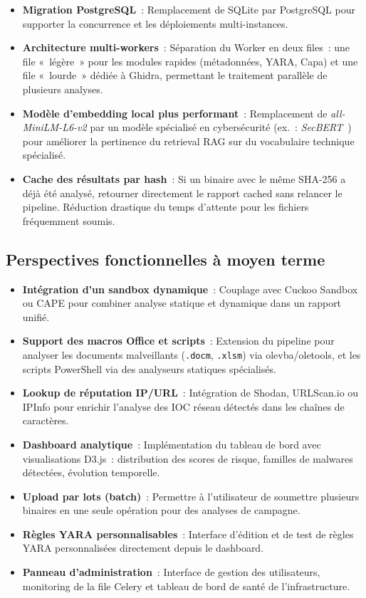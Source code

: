 \begin{itemize}
  \item \textbf{Migration PostgreSQL}~: Remplacement de SQLite par PostgreSQL pour supporter la concurrence et les déploiements multi-instances.
  \item \textbf{Architecture multi-workers}~: Séparation du Worker en deux files~: une file «~légère~» pour les modules rapides (métadonnées, YARA, Capa) et une file «~lourde~» dédiée à Ghidra, permettant le traitement parallèle de plusieurs analyses.
  \item \textbf{Modèle d'embedding local plus performant}~: Remplacement de \textit{all-MiniLM-L6-v2} par un modèle spécialisé en cybersécurité (ex.~: \textit{SecBERT}~\cite{secbert2022}) pour améliorer la pertinence du retrieval RAG sur du vocabulaire technique spécialisé.
  \item \textbf{Cache des résultats par hash}~: Si un binaire avec le même SHA-256 a déjà été analysé, retourner directement le rapport cached sans relancer le pipeline. Réduction drastique du temps d'attente pour les fichiers fréquemment soumis.
\end{itemize}

\subsection{Perspectives fonctionnelles à moyen terme}

\begin{itemize}
  \item \textbf{Intégration d'un sandbox dynamique}~: Couplage avec Cuckoo Sandbox ou CAPE pour combiner analyse statique et dynamique dans un rapport unifié.
  \item \textbf{Support des macros Office et scripts}~: Extension du pipeline pour analyser les documents malveillants (\texttt{.docm}, \texttt{.xlsm}) via olevba/oletools, et les scripts PowerShell via des analyseurs statiques spécialisés.
  \item \textbf{Lookup de réputation IP/URL}~: Intégration de Shodan, URLScan.io ou IPInfo pour enrichir l'analyse des IOC réseau détectés dans les chaînes de caractères.
  \item \textbf{Dashboard analytique}~: Implémentation du tableau de bord avec visualisations D3.js~: distribution des scores de risque, familles de malwares détectées, évolution temporelle.
  \item \textbf{Upload par lots (batch)}~: Permettre à l'utilisateur de soumettre plusieurs binaires en une seule opération pour des analyses de campagne.
  \item \textbf{Règles YARA personnalisables}~: Interface d'édition et de test de règles YARA personnalisées directement depuis le dashboard.
  \item \textbf{Panneau d'administration}~: Interface de gestion des utilisateurs, monitoring de la file Celery et tableau de bord de santé de l'infrastructure.
\end{itemize}


